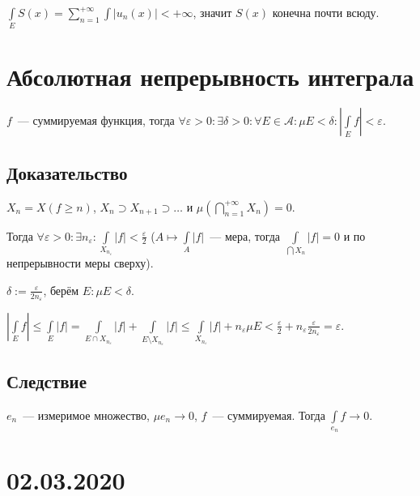 \documentclass{article}
\begin{document}
                $\int\limits_{E} S(x) = \sum\limits^{+\infty}_{n = 1} \int\limits | u_n(x) | < +\infty$, значит $S(x)$ конечна почти всюду.
    
    \newpage
    
    \section{Абсолютная непрерывность интеграла}
    
        $f$~--- суммируемая функция, тогда $\forall \varepsilon > 0 : \exists \delta > 0 : \forall E \in \mathcal{A} : \mu E < \delta : \left| \int\limits_{E} f \right| < \varepsilon$.
        
        \subsection{Доказательство}
        
            $X_n = X \left( f \geqslant n \right)$, $X_n \supset X_{n + 1} \supset \ldots$ и $\mu \left( \bigcap\limits^{+\infty}_{n = 1} X_n \right) = 0$.
            
            Тогда $\forall \varepsilon > 0 : \exists n_{\varepsilon} : \int\limits_{X_{n_{\varepsilon}}} |f| < \frac{\varepsilon}{2}$ ($A \mapsto \int\limits_{A} |f|$~--- мера, тогда $\int\limits_{\bigcap X_n} |f| = 0$ и по непрерывности меры сверху).
            
            $\delta := \frac{\varepsilon}{2 n_{\varepsilon}}$, берём $E : \mu E < \delta$.
            
            $\left| \int\limits_{E} f \right| \leqslant \int\limits_{E} |f| = \int\limits_{E \cap X_{n_{\varepsilon}}} |f| + \int\limits_{E \setminus X_{n_{\varepsilon}}} |f| \leqslant \int\limits_{X_{n_{\varepsilon}}} |f| + n_{\varepsilon} \mu E < \frac{\varepsilon}{2} + n_{\varepsilon} \frac{\varepsilon}{2 n_{\varepsilon}} = \varepsilon$.
            
        \subsection{Следствие}
        
            $e_n$~--- измеримое множество, $\mu e_n \rightarrow 0$, $f$~--- суммируемая. Тогда $\int\limits_{e_n} f \rightarrow 0$.
 
    \newpage
    
    \section{02.03.2020}
    
\end{document}
